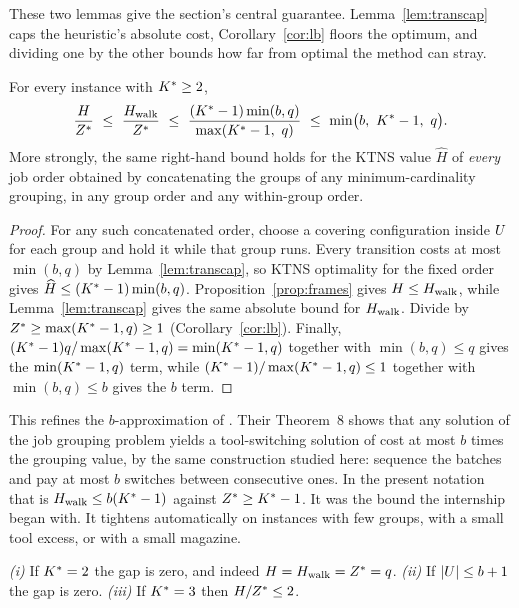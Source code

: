 These two lemmas give the section's central guarantee. Lemma~\ref{lem:transcap} caps
the heuristic's absolute cost, Corollary~\ref{cor:lb} floors the optimum, and
dividing one by the other bounds how far from optimal the method can stray.

\begin{theorem}\label{thm:uncond}
For every instance with $K^{\ast}\ge2$,
\[
  \frac{H}{Z^{\ast}}\ \le\ \frac{H_{\mathrm{walk}}}{Z^{\ast}}
  \ \le\ \frac{(K^{\ast}-1)\min(b,q)}{\max(K^{\ast}-1,\ q)}
  \ \le\ \min\bigl(b,\ K^{\ast}-1,\ q\bigr).
\]
More strongly, the same right-hand bound holds for the KTNS value $\widehat H$ of
\emph{every} job order obtained by concatenating the groups of any
minimum-cardinality grouping, in any group order and any within-group order.
\end{theorem}

\begin{proof}
For any such concatenated order, choose a covering configuration inside $U$ for
each group and hold it while that group runs. Every transition costs at most
$\min(b,q)$ by Lemma~\ref{lem:transcap}, so KTNS optimality for the fixed order gives
$\widehat H\le(K^{\ast}-1)\min(b,q)$. Proposition~\ref{prop:frames} gives
$H\le H_{\mathrm{walk}}$, while Lemma~\ref{lem:transcap} gives the same absolute bound for
$H_{\mathrm{walk}}$. Divide by $Z^{\ast}\ge\max(K^{\ast}-1,q)\ge1$ (Corollary~\ref{cor:lb}). Finally,
$(K^{\ast}-1)q/\max(K^{\ast}-1,q)=\min(K^{\ast}-1,q)$ together with $\min(b,q)\le q$
gives the $\min(K^{\ast}-1,q)$ term, while $(K^{\ast}-1)/\max(K^{\ast}-1,q)\le1$ together with
$\min(b,q)\le b$ gives the $b$ term.
\end{proof}

This refines the $b$-approximation of \citet{CramaKlundert1999}. Their Theorem~8
shows that any solution of the job grouping problem yields a tool-switching solution of
cost at most $b$ times the grouping value, by the same construction studied here:
sequence the batches and pay at most $b$ switches between consecutive ones. In the
present notation that is $H_{\mathrm{walk}}\le b(K^{\ast}-1)$ against $Z^{\ast}\ge K^{\ast}-1$. It was the bound the internship began
with. It tightens automatically on instances with few groups, with a small tool
excess, or with a small magazine.

\begin{corollary}\label{cor:zerogap}
\emph{(i)} If $K^{\ast}=2$ the gap is zero, and indeed $H=H_{\mathrm{walk}}=Z^{\ast}=q$.
\emph{(ii)} If $\lvert U\rvert\le b+1$ the gap is zero.
\emph{(iii)} If $K^{\ast}=3$ then $H/Z^{\ast}\le2$.
\end{corollary}

